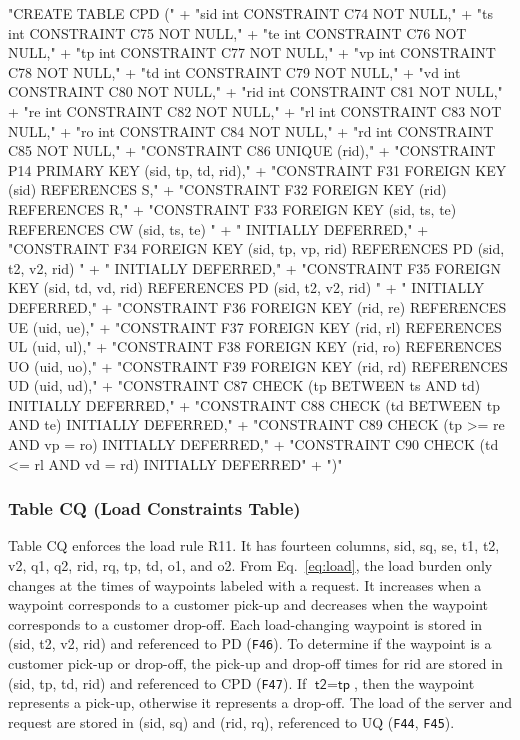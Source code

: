 \documentclass{article}
\def\nwendcode{\endtrivlist \endgroup}      %
\let\nwdocspar=\par
\theoremstyle{definition}                   %
\begin{document}
"CREATE TABLE CPD ("
  + "sid int  CONSTRAINT C74 NOT NULL,"
  + "ts  int  CONSTRAINT C75 NOT NULL,"
  + "te  int  CONSTRAINT C76 NOT NULL,"
  + "tp  int  CONSTRAINT C77 NOT NULL,"
  + "vp  int  CONSTRAINT C78 NOT NULL,"
  + "td  int  CONSTRAINT C79 NOT NULL,"
  + "vd  int  CONSTRAINT C80 NOT NULL,"
  + "rid int  CONSTRAINT C81 NOT NULL,"
  + "re  int  CONSTRAINT C82 NOT NULL,"
  + "rl  int  CONSTRAINT C83 NOT NULL,"
  + "ro  int  CONSTRAINT C84 NOT NULL,"
  + "rd  int  CONSTRAINT C85 NOT NULL,"
  + "CONSTRAINT C86 UNIQUE (rid),"
  + "CONSTRAINT P14 PRIMARY KEY (sid, tp, td, rid),"
  + "CONSTRAINT F31 FOREIGN KEY (sid) REFERENCES S,"
  + "CONSTRAINT F32 FOREIGN KEY (rid) REFERENCES R,"
  + "CONSTRAINT F33 FOREIGN KEY (sid, ts, te) REFERENCES CW (sid, ts, te) "
  + "  INITIALLY DEFERRED,"
  + "CONSTRAINT F34 FOREIGN KEY (sid, tp, vp, rid) REFERENCES PD (sid, t2, v2, rid) "
  + "  INITIALLY DEFERRED,"
  + "CONSTRAINT F35 FOREIGN KEY (sid, td, vd, rid) REFERENCES PD (sid, t2, v2, rid) "
  + "  INITIALLY DEFERRED,"
  + "CONSTRAINT F36 FOREIGN KEY (rid, re) REFERENCES UE (uid, ue),"
  + "CONSTRAINT F37 FOREIGN KEY (rid, rl) REFERENCES UL (uid, ul),"
  + "CONSTRAINT F38 FOREIGN KEY (rid, ro) REFERENCES UO (uid, uo),"
  + "CONSTRAINT F39 FOREIGN KEY (rid, rd) REFERENCES UD (uid, ud),"
  + "CONSTRAINT C87 CHECK (tp BETWEEN ts AND td) INITIALLY DEFERRED,"
  + "CONSTRAINT C88 CHECK (td BETWEEN tp AND te) INITIALLY DEFERRED,"
  + "CONSTRAINT C89 CHECK (tp >= re AND vp = ro) INITIALLY DEFERRED,"
  + "CONSTRAINT C90 CHECK (td <= rl AND vd = rd) INITIALLY DEFERRED"
  + ")"
\nwendcode{}\nwdocspar

\subsubsection{Table CQ (Load Constraints Table)}
Table CQ enforces the load rule R11. It has fourteen columns, \textsf{sid},
\textsf{sq}, \textsf{se}, \textsf{t1}, \textsf{t2}, \textsf{v2}, \textsf{q1},
\textsf{q2}, \textsf{rid}, \textsf{rq}, \textsf{tp}, \textsf{td}, \textsf{o1},
and \textsf{o2}.  From Eq.~\ref{eq:load}, the load burden only changes at the
times of waypoints labeled with a request. It increases when a waypoint
corresponds to a customer pick-up and decreases when the waypoint corresponds
to a customer drop-off. Each load-changing waypoint is stored in (\textsf{sid},
\textsf{t2}, \textsf{v2}, \textsf{rid}) and referenced to PD ({\tt{}F46}).  To
determine if the waypoint is a customer pick-up or drop-off, the pick-up and
drop-off times for \textsf{rid} are stored in (\textsf{sid}, \textsf{tp},
\textsf{td}, \textsf{rid}) and referenced to CPD ({\tt{}F47}).  If
$\textsf{t2}=\textsf{tp}$, then the waypoint represents a pick-up, otherwise it
represents a drop-off. The load of the server and request are stored in
(\textsf{sid}, \textsf{sq}) and (\textsf{rid}, \textsf{rq}), referenced to UQ
({\tt{}F44}, {\tt{}F45}).
\end{document}
